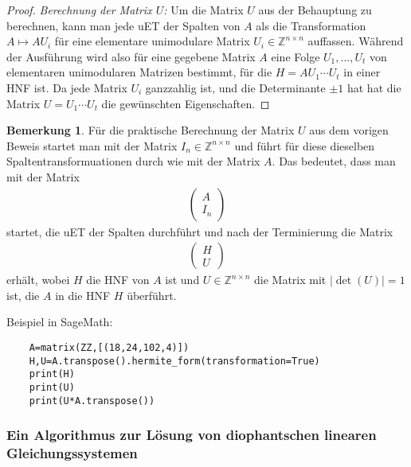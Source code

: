 \documentclass[
a4paper,landscape,16pt,
bibliography=totocnumbered,
numbers=noenddot,
]{scrartcl}
\numberwithin{equation}{subsection}
\newcommand{\Z}{\mathbb Z}
\theoremstyle{plain}
\theoremstyle{definition}
\newtheorem*{bem}{Bemerkung}
\begin{document}
\begin{proof}
	\emph{Berechnung der Matrix $U$:} Um die Matrix $U$ aus der Behauptung zu berechnen, kann man jede uET der Spalten von $A$ als die Transformation $A \mapsto A U_i$ für eine elementare unimodulare Matrix $U_i \in \Z^{n \times n}$ auffassen. Während der Ausführung wird also für eine gegebene Matrix $A$ eine Folge $U_1,\ldots,U_t$ von elementaren unimodularen Matrizen bestimmt, für die $H = A U_1 \cdots U_t$ in einer HNF ist. Da jede Matrix $U_i$ ganzzahlig ist, und die Determinante $\pm 1$ hat hat die Matrix $U = U_1 \cdots U_t$ die gewünschten Eigenschaften. 
\end{proof} 

\begin{bem} 
	Für die praktische Berechnung der Matrix $U$ aus dem vorigen Beweis startet man mit der Matrix $I_n \in \Z^{n \times n}$ und führt für diese dieselben Spaltentransformuationen durch wie mit der Matrix $A$. Das bedeutet, dass man mit der Matrix 
	\begin{align*}
			\begin{pmatrix} 
				A \\ I_n
			\end{pmatrix} 
	\end{align*} 
	startet, die uET der Spalten durchführt und nach der Terminierung die Matrix 
	\begin{align*}
		\begin{pmatrix*} 
			H \\ U
		\end{pmatrix*} 
	\end{align*} 
	erhält, wobei $H$ die HNF von $A$ ist und $U \in \Z^{n \times n}$ die Matrix mit $|\det(U)|=1$ ist, die $A$ in die HNF $H$ überführt. 
\end{bem} 

Beispiel in SageMath: 
\begin{verbatim}
	A=matrix(ZZ,[(18,24,102,4)])
	H,U=A.transpose().hermite_form(transformation=True)
	print(H)
	print(U)
	print(U*A.transpose())
\end{verbatim}


\subsubsection{Ein Algorithmus zur Lösung von diophantschen linearen Gleichungssystemen} 
\end{document}
